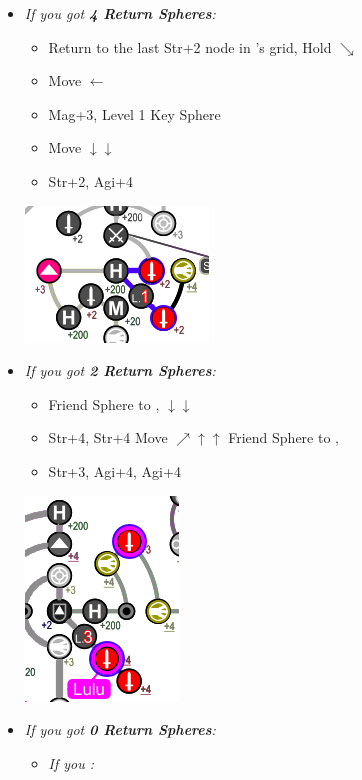 \begin{spheregrid}
\begin{multicols}{2}
\begin{itemize}
\begin{itemize}
				\item \textit{If you got \textbf{4 Return Spheres}:}
				      \begin{itemize}
					      \item Return to the last Str+2 node in \wakka's grid, Hold $\searrow$
					      \item Move $\leftarrow$
					      \item Mag+3, Level 1 Key Sphere
					      \item Move $\downarrow\downarrow$
					      \item Str+2, Agi+4
				      \end{itemize}
				      \includegraphics{graphics/4_returns_1}
				\item \textit{If you got \textbf{2 Return Spheres}:}
				      \begin{itemize}
					      \item Friend Sphere to \lulu,  $\downarrow\downarrow$
					      \item Str+4, Str+4
					            \luluf Move $\nearrow\uparrow\uparrow$
					            \yunaf Friend Sphere to \lulu,
					      \item Str+3, Agi+4, Agi+4
				      \end{itemize}
				      \includegraphics{graphics/2_and_2}
				      \columnbreak
				\item \textit{If you got \textbf{0 Return Spheres}:}
				      \begin{itemize}
					      \item \textit{If you \wonblitz:}
					            \begin{itemize}

\end{itemize}
\end{itemize}
\end{itemize}
\end{itemize}
\end{multicols}
\end{spheregrid}
